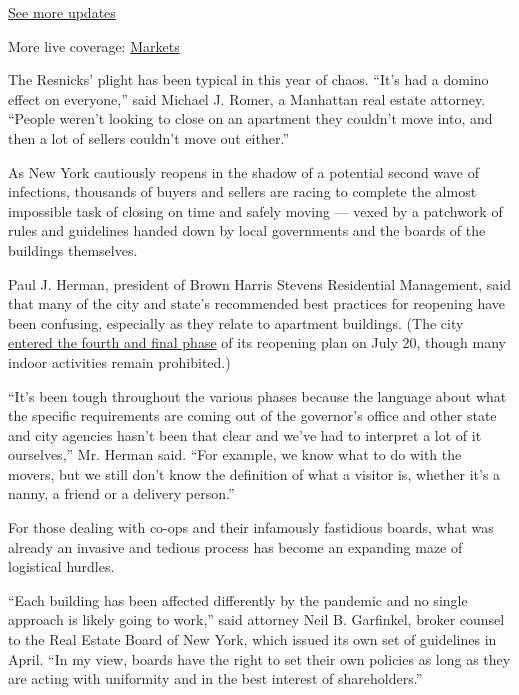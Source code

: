 \href{https://www.nytimes.com/2020/08/01/world/coronavirus-covid-19.html?action=click\&pgtype=Article\&state=default\&region=MAIN_CONTENT_1\&context=storylines_live_updates}{See
more updates}

More live coverage:
\href{https://www.nytimes.com/live/2020/07/31/business/stock-market-today-coronavirus?action=click\&pgtype=Article\&state=default\&region=MAIN_CONTENT_1\&context=storylines_live_updates}{Markets}

The Resnicks' plight has been typical in this year of chaos. ``It's had
a domino effect on everyone,'' said Michael J. Romer, a Manhattan real
estate attorney. ``People weren't looking to close on an apartment they
couldn't move into, and then a lot of sellers couldn't move out
either.''

As New York cautiously reopens in the shadow of a potential second wave
of infections, thousands of buyers and sellers are racing to complete
the almost impossible task of closing on time and safely moving ---
vexed by a patchwork of rules and guidelines handed down by local
governments and the boards of the buildings themselves.

Paul J. Herman, president of Brown Harris Stevens Residential
Management, said that many of the city and state's recommended best
practices for reopening have been confusing, especially as they relate
to apartment buildings. (The city
\href{https://www.nytimes.com/2020/07/20/nyregion/nyc-phase-4-reopening-coronavirus.html}{entered
the fourth and final phase} of its reopening plan on July 20, though
many indoor activities remain prohibited.)

``It's been tough throughout the various phases because the language
about what the specific requirements are coming out of the governor's
office and other state and city agencies hasn't been that clear and
we've had to interpret a lot of it ourselves,'' Mr. Herman said. ``For
example, we know what to do with the movers, but we still don't know the
definition of what a visitor is, whether it's a nanny, a friend or a
delivery person.''

For those dealing with co-ops and their infamously fastidious boards,
what was already an invasive and tedious process has become an expanding
maze of logistical hurdles.

``Each building has been affected differently by the pandemic and no
single approach is likely going to work,'' said attorney Neil B.
Garfinkel, broker counsel to the Real Estate Board of New York, which
issued its own set of guidelines in April. ``In my view, boards have the
right to set their own policies as long as they are acting with
uniformity and in the best interest of shareholders.''

